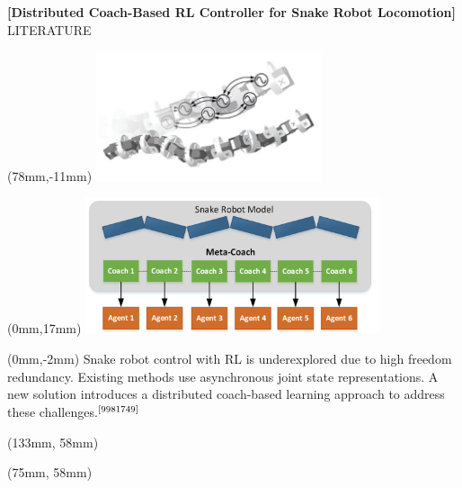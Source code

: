 \documentclass[11pt,aspectratio=169]{beamer}
\begin{document}
\begin{frame}[fragile]{\fontsize{10}{10}\selectfont\textbf{[Distributed Coach-Based RL Controller for Snake Robot Locomotion]} \hfill \fontsize{8}{8}\selectfont LITERATURE \newline [2022]}


        \begin{textblock*}{5cm}(78mm,-11mm) %
        \includegraphics[height=38mm,angle=50,origin=c]{elements/snake-3.png}
        \end{textblock*}
        
        \begin{textblock*}{5cm}(0mm,17mm) %
        \includegraphics[height=40mm]{elements/snake-1.png}
        \end{textblock*}

        \begin{textblock*}{87mm}(0mm,-2mm)
        Snake robot control with RL is underexplored due to high freedom redundancy. Existing methods use asynchronous joint state representations. A new solution introduces a distributed coach-based learning approach to address these challenges.$^{\text{\cite{9981749}}}$
        \end{textblock*}

        \begin{textblock*}{5cm}(133mm, 58mm) %
        {\tiny \cite{9517436}}
        \end{textblock*}

        \begin{textblock*}{5cm}(75mm, 58mm) %
        {\tiny \cite{9981749}}
        \end{textblock*}
        
        \vspace{52mm}
\end{frame}
\end{document}
